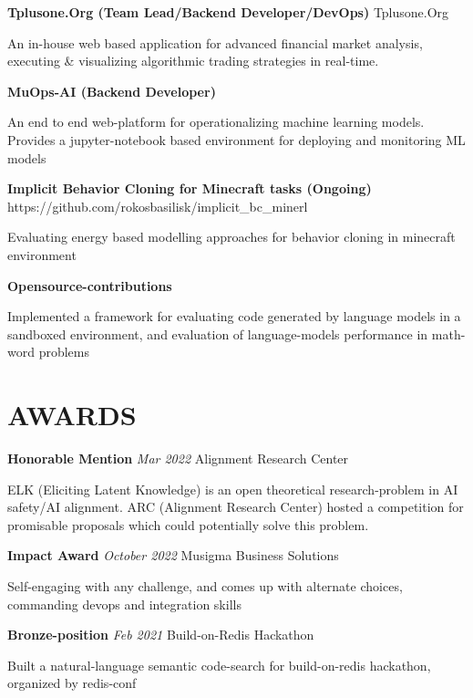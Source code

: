 \documentclass[fontsize=11pt]{article}
\newcommand{\sepspace}{\vspace*{1em}}   %
\newcommand{\NewPart}[1]{\section*{\uppercase{#1}}}
\newcommand{\EducationEntry}[4]{
    \noindent \textbf{#1} \hfill      %
    \colorbox{Black}{
      \parbox{8.5em}{
      \hfill\color{White}#2}} \par  %
    \noindent \textit{#3} \par        %
    \noindent\hangindent=2em\hangafter=0 \small #4 %
    \normalsize \par}
\newcommand{\ProjectEntry}[4]{         %
    \noindent \textbf{#1} \noindent \textit{#3} \hfill {#2} \par
    \noindent \small #4 %
    \normalsize \par}
\newcommand{\AwardEntry}[4]{         %
    \noindent \textbf{#1} \noindent \textit{#3} \hfill {#2} \par
    \noindent \small #4 %
    \normalsize \par}
\begin{document}
\ProjectEntry{Tplusone.Org (Team Lead/Backend Developer/DevOps)}{Tplusone.Org}
{}
{An in-house web based application for advanced financial market analysis, executing \& visualizing algorithmic trading strategies in real-time.}
\sepspace
\ProjectEntry{MuOps-AI (Backend Developer)}{}
{}
{An end to end web-platform for operationalizing machine learning models. Provides a jupyter-notebook based environment for deploying and monitoring ML models}
\sepspace
\ProjectEntry{Implicit Behavior Cloning for Minecraft tasks (Ongoing)}{https://github.com/rokosbasilisk/implicit\_bc\_minerl}
{}
{Evaluating energy based modelling approaches for behavior cloning in minecraft environment}
\sepspace
\ProjectEntry{Opensource-contributions}{}
{}
{Implemented a framework for evaluating code generated by language models in a sandboxed environment, and evaluation of language-model\textquotesingle{}s performance in math-word problems}
\NewPart{Awards}{}

\AwardEntry{Honorable Mention}{Alignment Research Center}
{Mar 2022}
{ELK (Eliciting Latent Knowledge) is an open theoretical research-problem in AI safety/AI alignment. ARC (Alignment Research Center) hosted a competition for promisable proposals which could potentially solve this problem.}
\sepspace
\AwardEntry{Impact Award}{Musigma Business Solutions}
{October 2022}
{Self-engaging with any challenge, and comes up with alternate choices, commanding devops and integration skills}
\sepspace
\AwardEntry{Bronze-position}{Build-on-Redis Hackathon}
{Feb 2021}
{Built a natural-language semantic code-search for build-on-redis hackathon, organized by redis-conf}
\ 
\end{document}
